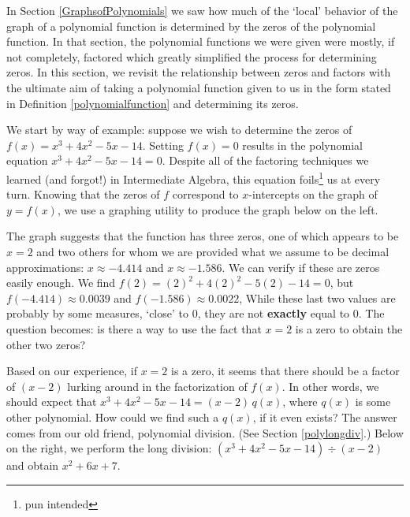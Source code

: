 

\setcounter{footnote}{0}

\label{Polydivision}


In Section \ref{GraphsofPolynomials} we saw how much of the `local' behavior of the graph of a polynomial function is  determined by the zeros of the polynomial function.  In that section, the polynomial functions we were given were mostly, if not completely, factored which greatly simplified the process for determining zeros.  In this section, we revisit the relationship between zeros and factors with the ultimate aim of taking a polynomial function given to us in the form stated in Definition \ref{polynomialfunction}  and determining its zeros. 

\medskip

 We start by way of example:  suppose we wish to determine the zeros of  $f(x) = x^3 + 4x^2-5x-14$.  Setting $f(x)=0$ results in the polynomial equation $x^3 + 4x^2-5x-14=0$.   Despite all of the factoring techniques we learned (and forgot!) in Intermediate Algebra, this equation foils\footnote{pun intended} us at every turn. Knowing that the zeros of $f$ correspond to $x$-intercepts on the graph of $y=f(x)$, we use a graphing utility to produce the graph below on the left.  
 
 \medskip
 
 The graph suggests that the function has three zeros, one of which appears to be $x=2$ and two others for whom we are provided what we assume to be decimal approximations:  $x \approx -4.414$ and $x \approx -1.586$.    We can verify if these are zeros easily enough.   We find  $f(2) =(2)^2 + 4(2)^2-5(2)-14 = 0$,  but  $f(-4.414) \approx 0.0039$ and $f(-1.586) \approx 0.0022$,  While these last two values are probably by some measures,  `close' to $0$, they are not \textbf{exactly} equal to $0$.  The question becomes:  is there a way to use the fact that $x=2$ is a zero to obtain the other two zeros?  
 
 \medskip
 
 Based on our experience, if $x=2$ is a zero, it seems that there should be a factor of $(x-2)$ lurking around in the factorization of $f(x)$.  In other words, we should expect that $x^3 + 4x^2-5x-14=(x-2) \, q(x)$, where $q(x)$ is some other polynomial.  How could we find such a $q(x)$, if it even exists?  The answer comes from our old friend, polynomial division. (See Section \ref{polylongdiv}.) Below on the right, we perform the long division:  $(x^3 + 4x^2-5x-14) \div (x-2)$ and obtain $x^2+6x+7$.
 

